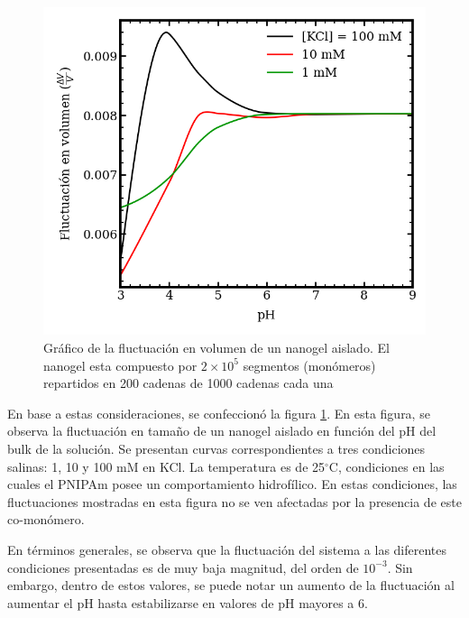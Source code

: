 	\begin{figure}
		\centering
		\includegraphics[width=0.45\linewidth]{Figures/graph-mc/fluct-pH.png}
		\caption{Gr\'afico de la fluctuaci\'on en volumen de un nanogel aislado. El nanogel esta compuesto por $2\times 10^5$ segmentos (mon\'omeros) repartidos en 200 cadenas de 1000 cadenas cada una}
		\label{fig:mc:flut-pH}
	\end{figure}
	
	En base a estas consideraciones, se confeccion\'o la figura \ref{fig:mc:flut-pH}. En esta figura, se observa la fluctuaci\'on en tama\~no de un nanogel aislado en funci\'on del pH del bulk de la soluci\'on. Se presentan curvas correspondientes a tres condiciones salinas: 1, 10 y 100 mM en KCl. La temperatura es de 25$^\circ$C, condiciones en las cuales el PNIPAm posee un comportamiento hidrof\'ilico. En estas condiciones, las fluctuaciones mostradas en esta figura no se ven afectadas por la presencia de este co-mon\'omero.
	
	En t\'erminos generales, se observa que la fluctuaci\'on del sistema a las diferentes condiciones presentadas es de muy baja magnitud, del orden de $10^{-3}$. Sin embargo, dentro de estos valores, se puede notar un aumento de la fluctuaci\'on al aumentar el pH hasta estabilizarse en valores de pH mayores a 6.
	
